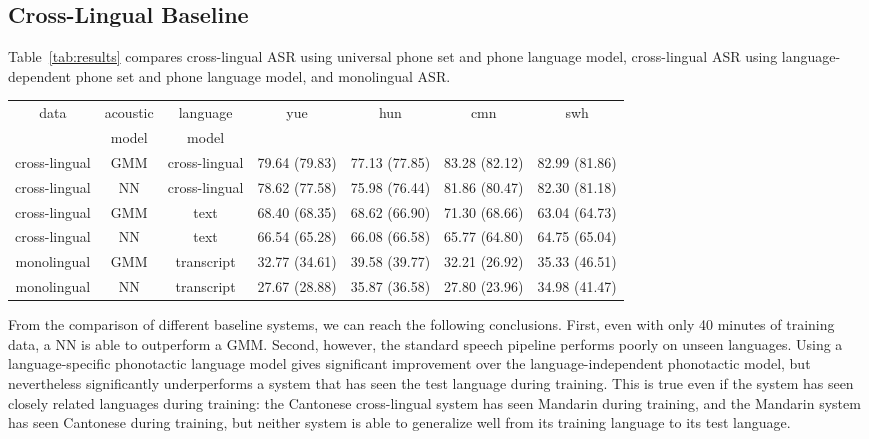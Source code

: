 \subsection{Cross-Lingual Baseline}
\label{s6:mlbaseline}

Table~\ref{tab:results} compares cross-lingual ASR using universal phone set and
phone language model, cross-lingual ASR using language-dependent phone
set and phone language model, and monolingual ASR.

\begin{table*}
\begin{center}
\begin{tabular}{|c|c|c|cccc|}
\hline
data & acoustic & language & yue & hun & cmn & swh \\
 & model & model &  & & & \\
\hline
cross-lingual & GMM & cross-lingual & 79.64 (79.83) & 77.13 (77.85) & 83.28 (82.12) & 82.99 (81.86) \\
cross-lingual & NN & cross-lingual & 78.62 (77.58) & 75.98 (76.44) & 81.86 (80.47) & 82.30 (81.18) \\
cross-lingual & GMM & text & 68.40 (68.35) & 68.62 (66.90) & 71.30 (68.66) & 63.04 (64.73) \\
cross-lingual & NN & text & 66.54 (65.28) & 66.08 (66.58) & 65.77 (64.80) & 64.75 (65.04) \\
\hline
monolingual & GMM & transcript & 32.77 (34.61) & 39.58 (39.77) & 32.21 (26.92) & 35.33 (46.51) \\
monolingual & NN & transcript & 27.67 (28.88) & 35.87 (36.58) & 27.80 (23.96) & 34.98 (41.47) \\
\hline
\end{tabular}
\caption{\label{tab:results} PERs of unadapted cross-lingual
  and monolingual ASR on
  the evaluation sets (development sets are in parentheses).
  Text-based language models are
  trained using Wikipedia.
  Transcript-based
  language models are based on
  native transcripts of the training data.}
\end{center}
\end{table*}

From the comparison of different baseline systems, we can reach the
following conclusions.  First, even with only 40 minutes of
training data, a NN is able to outperform a GMM.  Second,
however, the standard speech pipeline performs poorly on unseen
languages.  Using a language-specific phonotactic language model gives
significant improvement over the language-independent phonotactic
model, but nevertheless significantly underperforms a system that
has seen the test language during training.  This is true
even if the system has seen closely related languages during training:
the Cantonese cross-lingual system has seen Mandarin during training,
and the Mandarin system has seen Cantonese during training, but
neither system is able to generalize well from its training language to
its test language.


